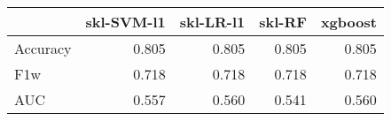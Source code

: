 \begin{tabular}{lrrrr}
\toprule
{} &  skl-SVM-l1 &  skl-LR-l1 &  skl-RF &  xgboost \\
\midrule
Accuracy &       0.805 &      0.805 &   0.805 &    0.805 \\
F1w      &       0.718 &      0.718 &   0.718 &    0.718 \\
AUC      &       0.557 &      0.560 &   0.541 &    0.560 \\
\bottomrule
\end{tabular}
